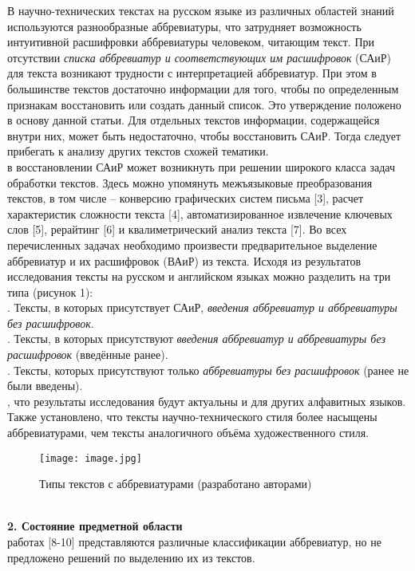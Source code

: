 \documentclass[a4paper, 12pt]{article}
\begin{document}
В научно-технических текстах на русском языке из различных областей знаний используются разнообразные аббревиатуры, что затрудняет возможность интуитивной расшифровки аббревиатуры человеком, читающим текст. При отсутствии \textit{списка аббревиатур и соответствующих им расшифровок} (САиР) для текста возникают трудности с интерпретацией аббревиатур. При этом в большинстве текстов достаточно информации для того, чтобы по определенным признакам восстановить или создать данный список. Это утверждение положено в основу данной статьи. Для отдельных текстов информации, содержащейся внутри них, может быть недостаточно, чтобы восстановить САиР. Тогда следует прибегать к анализу других текстов схожей тематики.\\
 в восстановлении САиР может возникнуть при решении широкого класса задач обработки текстов. Здесь можно упомянуть межъязыковые преобразования текстов, в том числе – конверсию графических систем письма [3], расчет характеристик сложности текста [4], автоматизированное извлечение ключевых слов [5], рерайтинг [6] и квалиметрический анализ текста [7]. Во всех перечисленных задачах необходимо произвести предварительное выделение аббревиатур и их расшифровок (ВАиР) из текста.
Исходя из результатов исследования тексты на русском и английском языках можно разделить на три типа (рисунок 1):\\
. Тексты, в которых присутствует САиР, \textit{введения аббревиатур и аббревиатуры без расшифровок}.\\
. Тексты, в которых присутствуют \textit{введения аббревиатур и аббревиатуры без расшифровок} (введённые ранее).\\
. Тексты, которых присутствуют только \textit{аббревиатуры без расшифровок} (ранее не были введены).\\
, что результаты исследования будут актуальны и для других алфавитных языков. Также установлено, что тексты научно-технического стиля более насыщены аббревиатурами, чем тексты аналогичного объёма художественного стиля.\\
\begin{figure}[!h]
    \centering
    \texttt{[image: image.jpg]}
    \caption{Типы текстов с аббревиатурами (разработано авторами)}
    \label{claster_pic1}
\end{figure}
\\
\indent\textbf{2. Состояние предметной области}\\
 работах [8-10] представляются различные классификации аббревиатур, но не предложено решений по выделению их из текстов.\\
\end{document}
